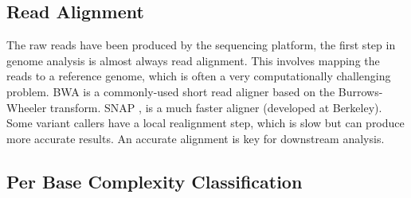 \documentclass[10pt]{article}
\begin{document}
%

\subsection{Read Alignment}

The raw reads have been produced by the sequencing platform, the first step in genome analysis is almost always read alignment. This involves mapping the reads to a reference genome, which is often a very computationally challenging problem. BWA \cite{bwa} is a commonly-used short read aligner based on the Burrows-Wheeler transform. SNAP \cite{snap}, is a much faster aligner (developed at Berkeley). Some variant callers have a local realignment step, which is slow but can produce more accurate results. An accurate alignment is key for downstream analysis.

\subsection{Per Base Complexity Classification}
\label{sec:classification}
\end{document}

